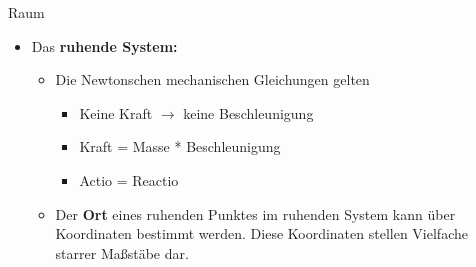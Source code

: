 \documentclass[]{beamer}%
\begin{document}
\begin{frame}{Raum}
    \begin{itemize}
        \item Das \textbf{\glqq{}ruhende System\grqq{}:}
        \begin{itemize}
            \item Die Newtonschen mechanischen Gleichungen gelten
            \begin{itemize}
                \item   Keine Kraft $\rightarrow$ keine Beschleunigung
                \item   Kraft = Masse * Beschleunigung
                \item   Actio = Reactio
            \end{itemize}
            \item       Der \textbf{Ort} eines ruhenden Punktes im ruhenden System
                        kann über Koordinaten 
                        bestimmt werden. Diese Koordinaten stellen Vielfache starrer 
                        Maßstäbe dar.
        \end{itemize}
    \end{itemize}
\end{frame}
\end{document}

